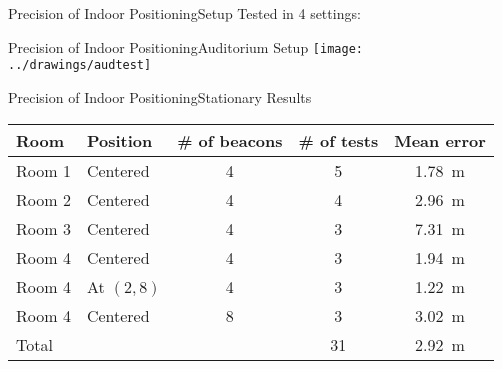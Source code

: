 \begin{frame}{Precision of Indoor Positioning}{Setup}
  Tested in 4 settings:
  
  \begin{center}
  \end{center}
  
  \begin{center}
    \scalebox{0.7}{
      
    }
  \end{center}
  
\end{frame}

\begin{frame}{Precision of Indoor Positioning}{Auditorium Setup}
  \centering\vfill
  \texttt{[image: ../drawings/audtest]}
\end{frame}

\begin{frame}{Precision of Indoor Positioning}{Stationary Results}
  \centering\vfill
  \begin{tabular}{l|l c c c}
  	Room   & Position   & \# of beacons & \# of tests & Mean error        \\ \hline
  	Room 1 & Centered   & \num{4}       & 5           & \SI{1.78}{\meter} \\
  	Room 2 & Centered   & \num{4}       & 4           & \SI{2.96}{\meter} \\
  	Room 3 & Centered   & \num{4}       & 3           & \SI{7.31}{\meter} \\
  	Room 4 & Centered   & \num{4}       & 3           & \SI{1.94}{\meter} \\
  	Room 4 & At $(2,8)$ & \num{4}       & 3           & \SI{1.22}{\meter} \\
  	Room 4 & Centered   & \num{8}       & 3           & \SI{3.02}{\meter} \\ \hline
  	Total  &            &               & 31          & \SI{2.92}{\meter}
  \end{tabular}
\end{frame}

